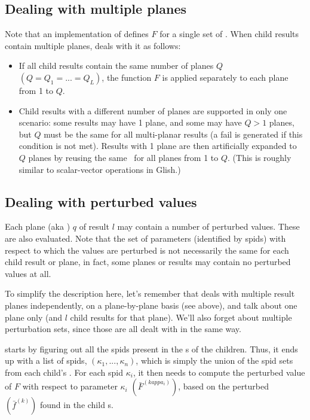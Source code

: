 \subsection{Dealing with multiple planes}

  Note that an implementation of  defines $F$ for a single set of
  \Vells. When child results contain multiple planes,  deals with
  it as follows:
  
  \begin{itemize}
  
  \item If all child results contain the same number of planes $Q$
  $(Q=Q_1=...=Q_L)$, the function $F$ is applied separately to each plane from
  1 to $Q$.

  \item Child results with a different number of planes are supported in only
  one scenario: some results may have 1 plane, and some may have $Q>1$ planes,
  but $Q$ must be the same for all multi-planar results (a fail is generated if
  this condition is not met). Results with 1 plane are then artificially
  expanded to $Q$ planes by reusing the same \VellSet\ for all planes from 1 to
  $Q$. (This is roughly similar to scalar-vector operations in Glish.)

  \end{itemize}
  
\subsection{Dealing with perturbed values}

  Each plane (aka \VellSet) $q$ of result $l$ may contain a number of perturbed
  values. These are also evaluated. Note that the set of parameters (identified
  by spids) with respect to which the values are perturbed is not necessarily
  the same for each child result or plane, in fact, some planes or results may
  contain no perturbed values at all.
  
  To simplify the description here, let's remember that  deals
  with multiple result planes independently, on a plane-by-plane basis (see
  above), and talk about one plane only (and $l$ child results for that plane).
  We'll also forget about multiple perturbation sets, since those are all dealt
  with in the same way. 

   starts by figuring out all the spids present in the \VellSet{}s
  of the children. Thus, it ends up with a list of spids,
  $(\kappa_1,...,\kappa_n)$, which is simply the union of the spid sets from
  each child's \VellSet. For each spid $\kappa_i$, it then needs to compute the
  perturbed value of $F$ with respect to parameter $\kappa_i$
  $(\bar{F}^{(kappa_i)})$, based on the perturbed \Vells\
  $(\bar{f}^{(k)})$ found in the child \VellSet{}s.

